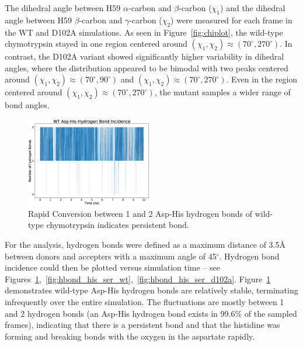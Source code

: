 \documentclass[11pt, twocolumn]{article}
\begin{document}
The dihedral angle between H59 \(\alpha\)-carbon and \(\beta\)-carbon
(\(\chi_1\)) and the dihedral angle between H59 \(\beta\)-carbon and
\(\gamma\)-carbon (\(\chi_2\)) were measured for each frame in the WT and
D102A simulations. As seen in Figure~\ref{fig:chiplot}, the wild-type
chymotrypsin stayed in one region centered around
\((\chi_1, \chi_2) \approx (70^\circ, 270^\circ)\).
In contrast, the D102A variant showed significantly higher variability
in dihedral angles, where the distribution appeared to be bimodal with
two peaks centered around \((\chi_1, \chi_2) \approx (70^\circ, 90^\circ)\)
and \((\chi_1, \chi_2) \approx (70^\circ, 270^\circ)\). Even in the region
centered around \((\chi_1, \chi_2) \approx (70^\circ, 270^\circ)\), the
mutant samples a wider range of bond angles.


\begin{figure}[H]
    \centering
        \includegraphics[width=0.49\textwidth]{wt_hbonds_asp_his.eps}
    \caption{Rapid Conversion between 1 and 2 Asp-His hydrogen bonds
        of wild-type chymotrypsin indicates persistent
        bond.}\label{fig:hbond_asp_his}
\end{figure}

For the analysis, hydrogen bonds were defined as a maximum distance of 3.5\AA{}
between donors and accepters with a maximum angle of 45\(^\circ\). Hydrogen
bond incidence could then be plotted versus simulation time -- see
Figures~\ref{fig:hbond_asp_his},~\ref{fig:hbond_his_ser_wt},~\ref{fig:hbond_his_ser_d102a}.
Figure~\ref{fig:hbond_asp_his} demonstrates wild-type Asp-His hydrogen bonds
are relatively stable, terminating infrequently over the entire simulation.
The fluctuations are mostly between 1 and 2 hydrogen bonds (an Asp-His hydrogen
bond exists in 99.6\% of the sampled frames), indicating that there is a persistent
bond and that the histidine was forming and breaking bonds with the oxygen in the
aspartate rapidly.
\end{document}
